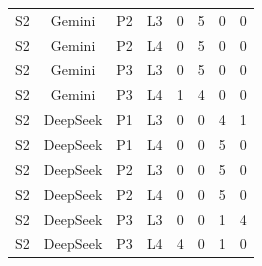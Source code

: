 \begin{table}[h]
\begin{tabular}{ccllcccc}
S2 & Gemini & P2 & L3 & 0 & 5 & 0 & 0 \\
S2 & Gemini & P2 & L4 & 0 & 5 & 0 & 0 \\
S2 & Gemini & P3 & L3 & 0 & 5 & 0 & 0 \\
S2 & Gemini & P3 & L4 & 1 & 4 & 0 & 0 \\
\midrule
S2 & DeepSeek & P1 & L3 & 0 & 0 & 4 & 1 \\
S2 & DeepSeek & P1 & L4 & 0 & 0 & 5 & 0 \\
S2 & DeepSeek & P2 & L3 & 0 & 0 & 5 & 0 \\
S2 & DeepSeek & P2 & L4 & 0 & 0 & 5 & 0 \\
S2 & DeepSeek & P3 & L3 & 0 & 0 & 1 & 4 \\
S2 & DeepSeek & P3 & L4 & 4 & 0 & 1 & 0 \\
\bottomrule
\end{tabular}
\end{table}